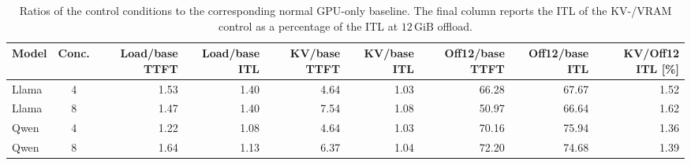 \begin{table}[t]
    \centering
    \caption{Ratios of the control conditions to the corresponding normal GPU-only baseline. The final column reports the ITL of the KV-/VRAM control as a percentage of the ITL at $12\,\mathrm{GiB}$ offload.}
    \label{tab:control_ratios}
    \scriptsize
    \setlength{\tabcolsep}{2.1pt}
    \begin{tabular}{lcrrrrrrr}
        \toprule
        Model & Conc. & Load/base TTFT & Load/base ITL & KV/base TTFT & KV/base ITL & Off12/base TTFT & Off12/base ITL & KV/Off12 ITL [\%] \\
        \midrule
        Llama & 4 & 1.53 & 1.40 & 4.64 & 1.03 & 66.28 & 67.67 & 1.52 \\
        Llama & 8 & 1.47 & 1.40 & 7.54 & 1.08 & 50.97 & 66.64 & 1.62 \\
        Qwen & 4 & 1.22 & 1.08 & 4.64 & 1.03 & 70.16 & 75.94 & 1.36 \\
        Qwen & 8 & 1.64 & 1.13 & 6.37 & 1.04 & 72.20 & 74.68 & 1.39 \\
        \bottomrule
    \end{tabular}
\end{table}
